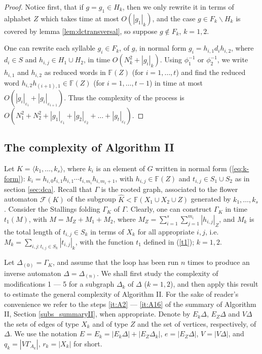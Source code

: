 \documentclass[a4paper,12pt]{article}
\newcommand{\G}{\Gamma }
\newcommand{\D}{\Delta }
\newcommand{\e}{\varepsilon }
\newcommand{\T}{\Theta }
\newcommand{\cF}{{\cal{F}}}
\numberwithin{equation}{section}
\numberwithin{figure}{section}
\newcommand{\FF}{\ensuremath{\mathbb{F}}}
\renewcommand{\cF}{\mathcal{F}}
\newcommand{\la}{\langle}
\newcommand{\ra}{\rangle}
\begin{document}
\begin{proof} Notice first, that if $g = g_1 \in H_k$, then we
only rewrite it in terms of alphabet $Z$ which takes time at most
$O(|g_1|_k)$, and the case $g \in F_k \smallsetminus H_k$ is
covered by lemma \ref{lem:dctransversal}, so suppose $g \notin
F_k$, $k=1,2$.

One can rewrite each syllable $g_i \in F_k$, of $g$, in normal form
$g_i=h_{i,1}d_ih_{i,2}$, where $d_i\in S$ and $h_{i,j}\in H_1\cup
H_2$, in time  $O(N^2_k + |g_i|_k)$. Using $\phi_1^{-1}$ or
$\phi_2^{-1}$, we write $h_{i,1}$ and $h_{i,2}$ as reduced words
in $\FF(Z)$ (for $i=1, \ldots, t$) and find the reduced word
$h_{i,2}h_{(i+1),1}\in \FF(Z)$ (for $i=1, \ldots, t-1$) in time at
most $O(|g_i|_{\e_i}+|g_i|_{\e_{i+1}})$.  Thus the
complexity of the process is $O(N^2_1+ N^2_2 +
|g_1|_{\e_1}+|g_2|_{\e_2}+ \ldots +|g_t|_{\e_t})$. \end{proof}


\subsection{The complexity of Algorithm II}\label{sub:resolution}

Let $K=\la k_1, \ldots , k_s\ra$, where $k_i$ is an element of $G$
written in normal form (\ref{eq:k-form}): $k_i=
h_{i,0}t_{i,1}h_{i,1}\cdots t_{i,m_i}h_{i,m_i+1}$, with
$h_{i,j}\in \FF(Z)$ and $t_{i,j}\in S_1\cup S_2$ as in section
\ref{sec:dca}. Recall that $\G$ is the rooted graph, associated to
the flower automaton $\cF(K)$ of the subgroup $\hat K < \FF(X_1\cup
X_2 \cup Z)$ generated by $k_1, \ldots , k_s$.
Consider the Stallings folding $\G_K$ of $\G$. Clearly, one can
construct $\G_K$ in time  $t_1(M)$, with $M = M_Z+M_1+M_2$,
 where $M_Z =
\mathop{\sum}\limits_{i=1}^{s}
\mathop{\sum}\limits_{j=1}^{m_i}|h_{i,j}|_Z$, and $M_k$ is the
total length of $t_{i,j} \in S_k$ in terms of $X_k$ for all
appropriate $i,j$, i.e. $M_k = \mathop{\sum}\limits_{i,j:
t_{i,j}\in S_k} |t_{i,j}|_k$, with the function $t_1$ defined in
(\ref{t1}); $k=1,2$.

Let $\D_{(0)} = \G_K$,
 and assume that the loop has been run $n$ times to produce an
inverse automaton $\D=\D_{(n)}$.
We shall
first study  the complexity of modifications 1 --- 5 for a subgraph $\D_k$ of $\D$ ($k=1,2$), and then apply this result
to estimate the general complexity of Algorithm II. For the sake of reader's convenience we refer to the steps \ref{it:A2} --- \ref{it:A16} of the summary of Algorithm II, Section \ref{subs_summaryII}, when appropriate. Denote by $E_k
\D$, $E_Z \D$ and $V\D$ the sets of edges of type $X_k$ and of
type $Z$ and the set of vertices, respectively, of  $\D$.
 We use the notation $E=E_k = |E_k \D| + |E_Z \D_k|$, $e = |E_Z \D|$, $V = |V \D|$, and $q_k = |V
\G_{A_k}|$, $r_k = |X_k|$ for short.
\end{document}
